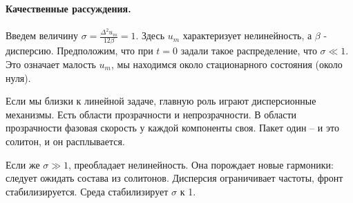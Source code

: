 \paragraph{Качественные рассуждения. } Введем величину $\sigma=\frac{\Delta^2 u_m}{12 \beta}=1$. Здесь $u_m$ характеризует нелинейность, а $\beta$ - дисперсию. Предположим, что при $t=0$ задали такое распределение, что $\sigma \ll 1$. Это означает малость $u_m$, мы находимся около стационарного состояния (около нуля). 

Если мы близки к линейной задаче, главную роль играют дисперсионные механизмы. Есть области прозрачности и непрозрачности. В области прозрачности фазовая скорость у каждой компоненты своя. Пакет один -- и это солитон, и он расплывается.

Если же $\sigma \gg 1$, преобладает нелинейность. Она порождает новые гармоники: следует ожидать состава из солитонов. Дисперсия ограничивает частоты, фронт стабилизируется. Среда стабилизирует $\sigma$ к 1.
